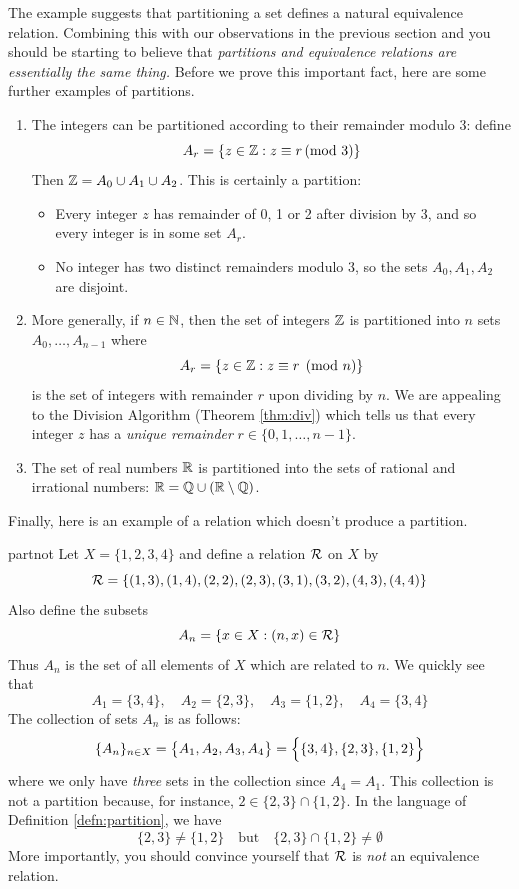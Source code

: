 The example suggests that partitioning a set defines a natural equivalence relation. Combining this with our observations in the previous section and you should be starting to believe that \emph{partitions and equivalence relations are essentially the same thing.} Before we prove this important fact, here are some further examples of partitions.

\begin{examples}{}{}
	\begin{enumerate}
		\item The integers can be partitioned according to their remainder modulo 3: define
		\[
			A_r=\{z\in\mathbb{Z}:z\equiv r\negthickspace\pmod{3}\}
		\]
		Then $\mathbb{Z}=A_0\cup A_1\cup A_2$. This is certainly a partition:
		\begin{itemize}
		  \item Every integer $z$ has remainder of 0, 1 or 2 after division by 3, and so every integer is in some set $A_r$.
		  \item No integer has two distinct remainders modulo 3, so the sets $A_0,A_1,A_2$ are disjoint.
		\end{itemize}
		\item\label{ex:cong} More generally, if $n\in\mathbb{N}$, then the set of integers $\mathbb{Z}$ is partitioned into $n$ sets $A_0,\ldots,A_{n-1}$ where
		\[
			A_r=\{z\in\mathbb{Z}:z\equiv r\pmod n\}
		\]
		is the set of integers with remainder $r$ upon dividing by $n$. We are appealing to the Division Algorithm (Theorem \ref{thm:div}) which tells us that every integer $z$ has a \emph{unique remainder} $r\in\{0,1,\ldots,n-1\}$.
		\item The set of real numbers $\mathbb{R}$ is partitioned into the sets of rational and irrational numbers: $\mathbb{R}=\mathbb{Q}\cup(\mathbb{R}\setminus\mathbb{Q})$.
	\end{enumerate}
\end{examples}

Finally, here is an example of a relation which doesn't produce a partition.

\begin{example}{}{partnot}
	Let $X=\{1,2,3,4\}$ and define a relation $\mathcal{R}$ on $X$ by
	\[
		\mathcal{R}=\{(1,3),(1,4),(2,2),(2,3),(3,1),(3,2),(4,3),(4,4)\}
	\]
	Also define the subsets
	\[
		A_n=\{x\in X:(n,x)\in\mathcal{R}\}
	\]
	Thus $A_n$ is the set of all elements of $X$ which are related to $n$. We quickly see that
	\[
		A_1=\{3,4\},\quad A_2=\{2,3\},\quad A_3=\{1,2\},\quad A_4=\{3,4\}
	\]
	The collection of sets $A_n$ is as follows:
	\[
		\{A_n\}_{n\in X}=\bigl\{A_1,A_2,A_3,A_4\bigr\}=\Bigl\{\{3,4\},\{2,3\},\{1,2\}\Bigr\}
	\]
	where we only have \emph{three} sets in the collection since $A_4=A_1$. This collection is not a partition because, for instance, $2\in \{2,3\}\cap\{1,2\}$. In the language of Definition \ref{defn:partition}, we have
	\[
		\{2,3\}\neq\{1,2\}\quad\text{but}\quad \{2,3\}\cap\{1,2\}\neq\emptyset
	\]
	More importantly, you should convince yourself that $\mathcal{R}$ is \emph{not} an equivalence relation.
\end{example}



